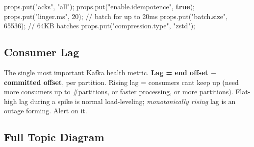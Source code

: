 \documentclass[11pt]{article}
\newenvironment{Shaded}{\begin{snugshade}}{\end{snugshade}}
\newcommand{\CommentTok}[1]{\textcolor[rgb]{0.48,0.49,0.49}{#1}}
\newcommand{\DecValTok}[1]{\textcolor[rgb]{0.96,0.45,0.00}{#1}}
\newcommand{\FunctionTok}[1]{\textcolor[rgb]{0.56,0.27,0.68}{#1}}
\newcommand{\KeywordTok}[1]{\textcolor[rgb]{0.81,0.81,0.76}{\textbf{#1}}}
\newcommand{\NormalTok}[1]{\textcolor[rgb]{0.81,0.81,0.76}{#1}}
\newcommand{\OperatorTok}[1]{\textcolor[rgb]{0.81,0.81,0.76}{#1}}
\newcommand{\StringTok}[1]{\textcolor[rgb]{0.96,0.31,0.31}{#1}}
\begin{document}

\begin{Shaded}
\begin{Highlighting}[]
\NormalTok{props}\OperatorTok{.}\FunctionTok{put}\OperatorTok{(}\StringTok{"acks"}\OperatorTok{,} \StringTok{"all"}\OperatorTok{);}
\NormalTok{props}\OperatorTok{.}\FunctionTok{put}\OperatorTok{(}\StringTok{"enable.idempotence"}\OperatorTok{,} \KeywordTok{true}\OperatorTok{);}
\NormalTok{props}\OperatorTok{.}\FunctionTok{put}\OperatorTok{(}\StringTok{"linger.ms"}\OperatorTok{,} \DecValTok{20}\OperatorTok{);}          \CommentTok{// batch for up to 20ms}
\NormalTok{props}\OperatorTok{.}\FunctionTok{put}\OperatorTok{(}\StringTok{"batch.size"}\OperatorTok{,} \DecValTok{65536}\OperatorTok{);}      \CommentTok{// 64KB batches}
\NormalTok{props}\OperatorTok{.}\FunctionTok{put}\OperatorTok{(}\StringTok{"compression.type"}\OperatorTok{,} \StringTok{"zstd"}\OperatorTok{);}
\end{Highlighting}
\end{Shaded}

\subsection{Consumer Lag}\label{consumer-lag}

The single most important Kafka health metric. \textbf{Lag = end offset \(-\) committed offset}, per partition. Rising lag = consumers can\textquotesingle t keep up (need more consumers up to \#partitions, or faster processing, or more partitions). Flat-high lag during a spike is normal load-leveling; \emph{monotonically rising} lag is an outage forming. Alert on it.

\subsection{Full Topic Diagram}\label{full-topic-diagram}

\setcodelang{}
\end{document}
